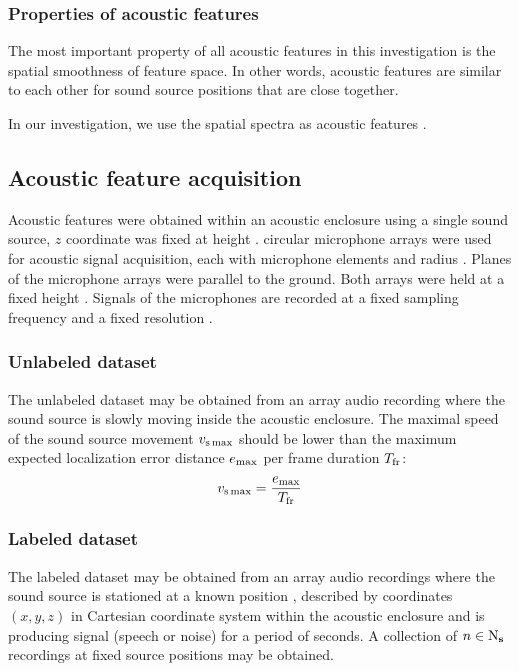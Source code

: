 \documentclass[applsci,article,submit,moreauthors,pdftex]{Definitions/mdpi}
\begin{document}
\subsubsection{Properties of acoustic features}
The most important property of all acoustic features in this investigation is the spatial smoothness of feature space. In other words, acoustic features are similar to each other for sound source positions that are close together.

In our investigation, we use the \srpphat{} spatial spectra as acoustic features \cite{dibiaseHighaccuracyLowlatencyTechnique2000,scheiblerPyroomacousticsPythonPackage2018a}. 

\subsection{Acoustic feature acquisition}
Acoustic features were obtained within an acoustic enclosure using a single sound source, $ z $ coordinate was fixed at height \hsrc{}. \Narr{} circular microphone arrays were used for acoustic signal acquisition, each with \Nmic{} microphone elements and radius \rarr{}.
Planes of the microphone arrays were parallel to the ground.
Both arrays were held at a fixed height \harr{}.
Signals of the microphones are recorded at a fixed sampling frequency \fs{} and a fixed resolution \resolution{}.

\subsubsection{Unlabeled dataset}
The unlabeled dataset may be obtained from an array audio recording where the sound source is slowly moving inside the acoustic enclosure. The maximal speed of the sound source movement $ v_{\mathrm{s}\max} $ should be lower than the maximum expected localization error distance $ e_{\max} $ per frame duration $ T_{\mathrm{fr}} $:
\begin{equation}\label{eq:unlabeled_src_max_speed}
v_{\mathrm{s}\max}  = \frac{e_{\max}}{T_{\mathrm{fr}}}
\end{equation} 
\subsubsection{Labeled dataset}
The labeled dataset may be obtained from an array audio recordings where the sound source is stationed at a known position \sposlabel{}, described by coordinates $ (x,y,z) $ in Cartesian coordinate system within the acoustic enclosure and is producing signal (speech or noise) for a period of  seconds. A collection of $ n \in \mathrm{N}_{\mathbf{s}} $ recordings at fixed source positions may be obtained.
\end{document}
